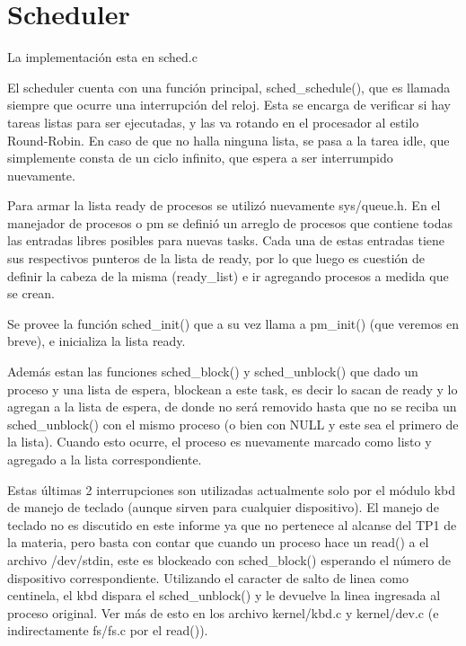 \section{Scheduler}

La implementación esta en sched.c

El scheduler cuenta con una función principal, sched\_schedule(), que es
llamada siempre que ocurre una interrupción del reloj. Esta se encarga de
verificar si hay tareas listas para ser ejecutadas, y las va rotando en el
procesador al estilo Round-Robin. En caso de que no halla ninguna lista, se
pasa a la tarea idle, que simplemente consta de un ciclo infinito, que espera a
ser interrumpido nuevamente.

Para armar la lista ready de procesos se utilizó nuevamente sys/queue.h. En el
manejador de procesos o pm se definió un arreglo de procesos que contiene todas
las entradas libres posibles para nuevas tasks. Cada una de estas entradas
tiene sus respectivos punteros de la lista de ready, por lo que luego es
cuestión de definir la cabeza de la misma (ready\_list) e ir agregando procesos
a medida que se crean.

Se provee la función sched\_init() que a su vez llama a pm\_init() (que veremos
en breve), e inicializa la lista ready.

Además estan las funciones sched\_block() y sched\_unblock() que dado un
proceso y una lista de espera, blockean a este task, es decir lo sacan de
ready y lo agregan a la lista de espera, de
donde no será removido hasta que no se reciba un sched\_unblock() con el mismo
proceso (o bien con NULL y este sea el primero de la lista). Cuando esto ocurre,
el proceso es nuevamente marcado como listo y agregado a la lista correspondiente.

Estas últimas 2 interrupciones son utilizadas actualmente solo por el módulo
kbd de manejo de teclado (aunque sirven para cualquier dispositivo). El manejo
de teclado no es discutido en este informe ya que no pertenece al alcanse del
TP1 de la materia, pero basta con contar que cuando un proceso hace un read() a
el archivo /dev/stdin, este es blockeado con sched\_block() esperando el número
de dispositivo correspondiente. Utilizando el caracter de salto de linea como
centinela, el kbd dispara el sched\_unblock() y le devuelve la linea ingresada
al proceso original. Ver más de esto en los archivo kernel/kbd.c y kernel/dev.c
(e indirectamente fs/fs.c por el read()).

